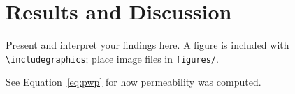 \chapter{Results and Discussion}
\label{ch:results}

Present and interpret your findings here. A figure is included with
\texttt{\textbackslash includegraphics}; place image files in \texttt{figures/}.


See Equation~\eqref{eq:pwp} for how permeability was computed.
